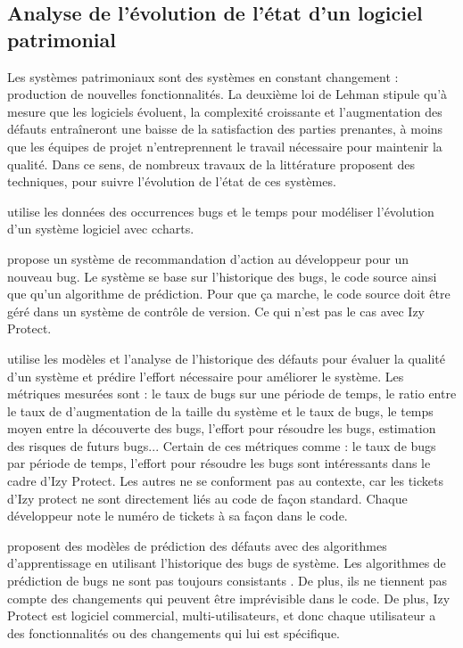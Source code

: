\documentclass[a4paper]{article}
\begin{document}
\subsection{Analyse de l'évolution de l'état d'un logiciel patrimonial}
\label{sec:etatLogiciel}

Les systèmes patrimoniaux sont des systèmes en constant changement : production de nouvelles fonctionnalités.
La deuxième loi de Lehman \cite{Lehm96a} stipule qu'à mesure que les logiciels évoluent, la complexité croissante et l'augmentation des défauts entraîneront une baisse de la satisfaction des parties prenantes, à moins que les équipes de projet n'entreprennent le travail nécessaire pour maintenir la qualité.
Dans ce sens, de nombreux travaux de la littérature proposent des techniques, pour suivre l'évolution de l'état de ces systèmes.

\citet{Zhan10b} utilise les données des occurrences bugs et le temps pour modéliser l'évolution d'un système logiciel avec c\-charts.

\citet{lenar17} propose un système de recommandation d'action au développeur pour un nouveau bug. Le système se base sur l'historique des bugs, le code source ainsi que qu'un algorithme de prédiction. Pour que ça marche, le code source doit être géré dans un système de contrôle de version. Ce qui n'est pas le cas avec Izy Protect.

\citet{port17} utilise les modèles et l'analyse de l'historique des défauts pour évaluer la qualité d'un système et prédire l'effort nécessaire pour améliorer le système. Les métriques mesurées sont : le taux de bugs sur une période de temps, le ratio entre le taux de d'augmentation de la taille du système et le taux de bugs, le temps moyen entre la découverte des bugs, l'effort pour résoudre les bugs, estimation des risques de futurs bugs...
Certain de ces métriques comme : le taux de bugs par période de temps, l'effort pour résoudre les bugs sont intéressants dans le cadre d'Izy Protect. 
Les autres ne se conforment pas au contexte, car les tickets d'Izy protect ne sont directement liés au code de façon standard.
Chaque développeur note le numéro de tickets à sa façon dans le code. 


\citet{kim07,Bibi06} proposent des modèles de prédiction des défauts avec des algorithmes d'apprentissage en utilisant l'historique des bugs de système. 
Les algorithmes de prédiction de bugs ne sont pas toujours consistants \cite{bang19}. De plus, ils ne tiennent pas compte des changements qui peuvent être imprévisible dans le code. De plus, Izy Protect est logiciel commercial, multi-utilisateurs, et donc chaque utilisateur a des fonctionnalités ou des changements qui lui est spécifique. 
\end{document}

